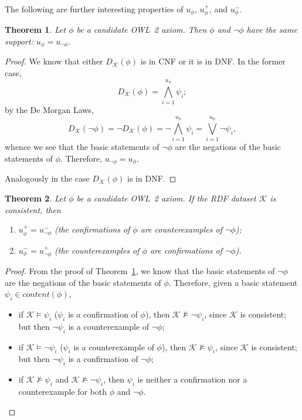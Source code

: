 \documentclass[review]{elsarticle}
\newtheorem{theorem}{Theorem}
\theoremstyle{definition}
\begin{document}
The following are further interesting properties
of $u_\phi$, $u^+_\phi$, and $u^-_\phi$.

\begin{theorem}\label{th:u-phi-equals-u-not-phi}
Let $\phi$ be a candidate OWL~2 axiom. Then $\phi$ and $\neg\phi$ have the same support:
$u_\phi = u_{\neg\phi}$.
\end{theorem}

\begin{proof}
  We know that either $D_{\mathcal{K}}(\phi)$ is in CNF or it is in DNF.
  In the former case,
  \[
    D_{\mathcal{K}}(\phi) = \bigwedge_{i = 1}^{u_\phi} \psi_i;
  \]
  by the De Morgan Laws,
  \[
    D_{\mathcal{K}}(\neg\phi) = \neg D_{\mathcal{K}}(\phi) =
    \neg\bigwedge_{i = 1}^{u_\phi} \psi_i =
    \bigvee_{i = 1}^{u_\phi} \neg\psi_i,
  \]
  whence we see that the basic statements of $\neg\phi$ are the negations of the
  basic statements of $\phi$. Therefore, $u_{\neg\phi} = u_\phi$.
  
  Analogously in the case $D_{\mathcal{K}}(\phi)$ is in DNF.
\end{proof}

\begin{theorem}\label{th:confirmation-counterexample}
Let $\phi$ be a candidate OWL~2 axiom. If the RDF dataset $\mathcal{K}$ is consistent,
then
\begin{enumerate}
\item $u_\phi^+ = u_{\neg\phi}^-$ (the confirmations of $\phi$ are counterexamples of $\neg\phi$);
\item $u_\phi^- = u_{\neg\phi}^+$ (the counterexamples of $\phi$ are confirmations of $\neg\phi$).
\end{enumerate}
\end{theorem}

\begin{proof}
  From the proof of Theorem~\ref{th:u-phi-equals-u-not-phi}, we know that
  the basic statements of $\neg\phi$ are the negations of the basic statements
  of $\phi$. Therefore, given a basic statement $\psi_i \in content(\phi)$,
  \begin{itemize}
  \item if $\mathcal{K} \models \psi_i$ ($\psi_i$ is a confirmation of $\phi$),
    then $\mathcal{K} \not\models \neg\psi_i$, since $\mathcal{K}$ is consistent;
    but then $\neg\psi_i$ is a counterexample of $\neg\phi$;
  \item if $\mathcal{K} \models \neg\psi_i$ ($\psi_i$ is a counterexample of $\phi$),
    then $\mathcal{K} \not\models \psi_i$, since $\mathcal{K}$ is consistent;
    but then $\neg\psi_i$ is a confirmation of $\neg\phi$;
  \item if $\mathcal{K} \not\models \psi_i$ and $\mathcal{K} \not\models \neg\psi_i$,
    then $\psi_i$ is neither a confirmation nor a counterexample for both $\phi$
    and $\neg\phi$.
  \end{itemize}
\end{proof}
\end{document}
